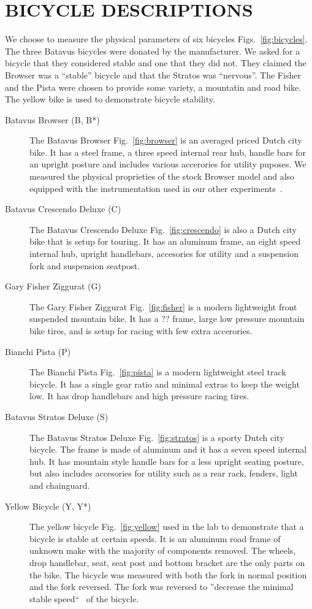 \documentclass{bmd2010p}
\begin{document}
\section{BICYCLE DESCRIPTIONS}
We choose to measure the physical parameters of six bicycles
Figs.~\ref{fig:bicycles}. The three Batavus bicycles were donated by the
manufacturer. We asked for a bicycle that they considered stable and one that
they did not. They claimed the Browser was a ``stable'' bicycle and that the
Stratos was ``nervous''. The Fisher and the Pista were chosen to provide some
variety, a mountatin and road bike. The yellow bike is used to demonstrate
bicycle stability.
\begin{description}
    \item[Batavus Browser (B, B*)]{The Batavus Browser Fig.~\ref{fig:browser} is an averaged priced Dutch city
        bike. It has a steel frame, a three speed internal rear hub, handle
        bars for an upright posture and includes various accerories for utility
        puposes. We measured the physical proprieties of the stock Browser model and
        also equipped with the instrumentation used in our other
        experiments~\cite{Kooijman2009}.}
    \item[Batavus Crescendo Deluxe (C)]{The Batavus Crescendo Deluxe
        Fig.~\ref{fig:crescendo} is also a
        Dutch city bike that is setup for touring. It has an aluminum frame, an
        eight speed internal hub, upright handlebars, accesories for utility
        and a suspension fork and suspension seatpost.}
    \item[Gary Fisher Ziggurat (G)]{The Gary Fisher Ziggurat Fig.~\ref{fig:fisher} is a modern
        lightweight front suspended mountain bike. It has a ?? frame, large low
        pressure mountain bike tires, and is setup for racing with few extra accerories.}
    \item[Bianchi Pista (P)]{The Bianchi Pista Fig.~\ref{fig:pista} is a modern lightweight steel track
        bicycle. It has a single gear ratio and minimal extras to keep the
        weight low. It has drop handlebars and high pressure racing tires.}
    \item[Batavus Stratos Deluxe (S)]{The Batavus Stratos Deluxe
        Fig.~\ref{fig:stratos} is a sporty Dutch city bicycle. The frame is
        made of aluminum and it has a seven speed internal hub. It has mountain
        style handle bars for a less upright seating posture, but also includes
        accesories for utility such as a rear rack, fenders, light and
        chainguard.}
    \item[Yellow Bicycle (Y, Y*)]{The yellow bicycle Fig.~\ref{fig:yellow} used in the lab to
        demonstrate that a bicycle is stable at certain speeds. It is an
        aluminum road frame of unknown make with the majority of components
        removed. The wheels, drop handlebar, seat, seat post and bottom bracket
        are the only parts on the bike. The bicycle was measured with both the
        fork in normal position and the fork reversed. The fork was reversed to
        ''decrease the minimal stable speed``~\cite{Kooijman2006} of the bicycle.}
\end{description}
\end{document}
